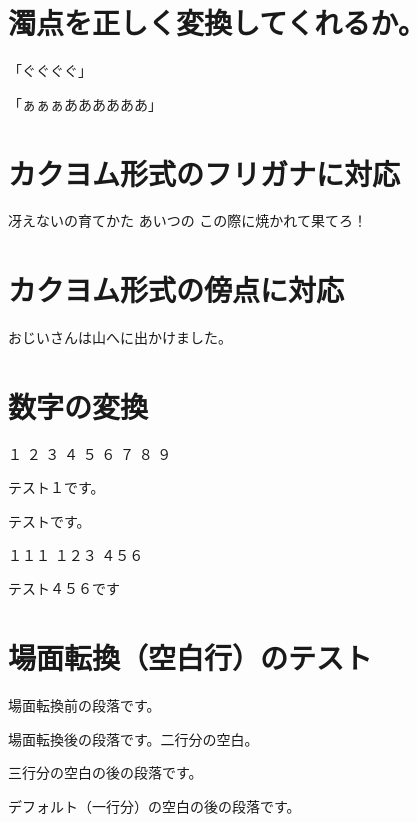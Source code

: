 \hypertarget{ux6fc1ux70b9ux3092ux6b63ux3057ux304fux5909ux63dbux3057ux3066ux304fux308cux308bux304b}{%
\section{濁点を正しく変換してくれるか。}\label{ux6fc1ux70b9ux3092ux6b63ux3057ux304fux5909ux63dbux3057ux3066ux304fux308cux308bux304b}}

「ぐぐぐぐ」

「ぁぁぁああああああ」

\hypertarget{ux30abux30afux30e8ux30e0ux5f62ux5f0fux306eux30d5ux30eaux30acux30caux306bux5bfeux5fdc}{%
\section{カクヨム形式のフリガナに対応}\label{ux30abux30afux30e8ux30e0ux5f62ux5f0fux306eux30d5ux30eaux30acux30caux306bux5bfeux5fdc}}

冴えないの育てかた
あいつの
この際に焼かれて果てろ！

\hypertarget{ux30abux30afux30e8ux30e0ux5f62ux5f0fux306eux508dux70b9ux306bux5bfeux5fdc}{%
\section{カクヨム形式の傍点に対応}\label{ux30abux30afux30e8ux30e0ux5f62ux5f0fux306eux508dux70b9ux306bux5bfeux5fdc}}

おじいさんは山へに出かけました。

\hypertarget{ux6570ux5b57ux306eux5909ux63db}{%
\section{数字の変換}\label{ux6570ux5b57ux306eux5909ux63db}}

１ ２ ３ ４ ５ ６ ７ ８ ９

テスト１です。

{\small{}} {\small{}}
{\small{}}

テスト{\small{}}です。

１１１ １２３ ４５６

テスト４５６です

\hypertarget{ux5834ux9762ux8ee2ux63dbux7a7aux767dux884cux306eux30c6ux30b9ux30c8}{%
\section{場面転換（空白行）のテスト}\label{ux5834ux9762ux8ee2ux63dbux7a7aux767dux884cux306eux30c6ux30b9ux30c8}}

場面転換前の段落です。

\vspace{2\baselineskip}

場面転換後の段落です。二行分の空白。

\vspace{3\baselineskip}

三行分の空白の後の段落です。

\vspace{1\baselineskip}

デフォルト（一行分）の空白の後の段落です。
